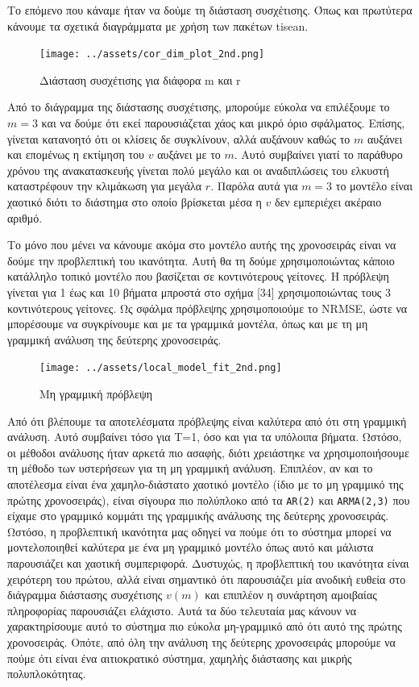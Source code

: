 \documentclass[11pt,]{article}
\begin{document}
Το επόμενο που κάναμε ήταν να δούμε τη διάσταση συσχέτισης. Όπως και
πρωτύτερα κάνουμε τα σχετικά διαγράμματα με χρήση των πακέτων tisean.

\begin{figure}
\centering
\texttt{[image: ../assets/cor\_dim\_plot\_2nd.png]}
\caption{Διάσταση συσχέτισης για διάφορα m και r}
\end{figure}

Από το διάγραμμα της διάστασης συσχέτισης, μπορούμε εύκολα να επιλέξουμε
το \(m=3\) και να δούμε ότι εκεί παρουσιάζεται χάος και μικρό όριο
σφάλματος. Επίσης, γίνεται κατανοητό ότι οι κλίσεις δε συγκλίνουν, αλλά
αυξάνουν καθώς το \(m\) αυξάνει και επομένως η εκτίμηση του \(v\)
αυξάνει με το \(m\). Αυτό συμβαίνει γιατί το παράθυρο χρόνου της
ανακατασκευής γίνεται πολύ μεγάλο και οι αναδιπλώσεις του ελκυστή
καταστρέφουν την κλιμάκωση για μεγάλα \(r\). Παρόλα αυτά για \(m=3\) το
μοντέλο είναι χαοτικό διότι το διάστημα στο οποίο βρίσκεται μέσα η \(v\)
δεν εμπεριέχει ακέραιο αριθμό.

Το μόνο που μένει να κάνουμε ακόμα στο μοντέλο αυτής της χρονοσειράς
είναι να δούμε την προβλεπτική του ικανότητα. Αυτή θα τη δούμε
χρησιμοποιώντας κάποιο κατάλληλο τοπικό μοντέλο που βασίζεται σε
κοντινότερους γείτονες. Η πρόβλεψη γίνεται για 1 έως και 10 βήματα
μπροστά στο σχήμα {[}34{]} χρησιμοποιώντας τους 3 κοντινότερους
γείτονες. Ως σφάλμα πρόβλεψης χρησιμοποιούμε το NRMSE, ώστε να
μπορέσουμε να συγκρίνουμε και με τα γραμμικά μοντέλα, όπως και με τη μη
γραμμική ανάλυση της δεύτερης χρονοσειράς.

\begin{figure}
\centering
\texttt{[image: ../assets/local\_model\_fit\_2nd.png]}
\caption{Μη γραμμική πρόβλεψη}
\end{figure}

Από ότι βλέπουμε τα αποτελέσματα πρόβλεψης είναι καλύτερα από ότι στη
γραμμική ανάλυση. Αυτό συμβαίνει τόσο για T=1, όσο και για τα υπόλοιπα
βήματα. Ωστόσο, οι μέθοδοι ανάλυσης ήταν αρκετά πιο ασαφής, διότι
χρειάστηκε να χρησιμοποιήσουμε τη μέθοδο των υστερήσεων για τη μη
γραμμική ανάλυση. Επιπλέον, αν και το αποτέλεσμα είναι ένα
χαμηλο-διάστατο χαοτικό μοντέλο (ίδιο με το μη γραμμικό της πρώτης
χρονοσειράς), είναι σίγουρα πιο πολύπλοκο από τα \texttt{AR(2)} και
\texttt{ARMA(2,3)} που είχαμε στο γραμμικό κομμάτι της γραμμικής
ανάλυσης της δεύτερης χρονοσειράς. Ωστόσο, η προβλεπτική ικανότητα μας
οδηγεί να πούμε ότι το σύστημα μπορεί να μοντελοποιηθεί καλύτερα με ένα
μη γραμμικό μοντέλο όπως αυτό και μάλιστα παρουσιάζει και χαοτική
συμπεριφορά. Δυστυχώς, η προβλεπτική του ικανότητα είναι χειρότερη του
πρώτου, αλλά είναι σημαντικό ότι παρουσιάζει μία ανοδική ευθεία στο
διάγραμμα διάστασης συσχέτισης \(v(m)\) και επιπλέον η συνάρτηση
αμοιβαίας πληροφορίας παρουσιάζει ελάχιστο. Αυτά τα δύο τελευταία μας
κάνουν να χαρακτηρίσουμε αυτό το σύστημα πιο εύκολα μη-γραμμικό από ότι
αυτό της πρώτης χρονοσειράς. Οπότε, από όλη την ανάλυση της δεύτερης
χρονοσειράς μπορούμε να πούμε ότι είναι ένα αιτιοκρατικό σύστημα,
χαμηλής διάστασης και μικρής πολυπλοκότητας.
\end{document}
